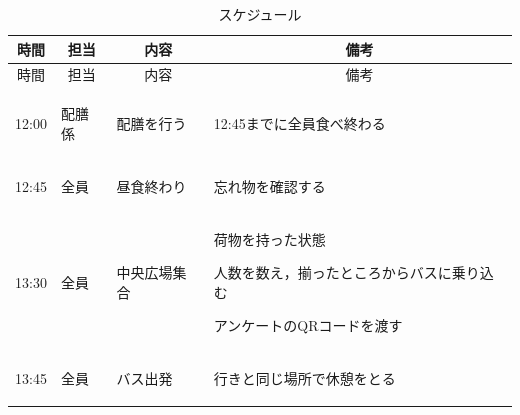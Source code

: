 \begin{longtable}[c]{|p{}|p{}|p{}|p{}|}
  \caption{スケジュール} \\
  \hline
  \multicolumn{1}{|c|}{時間} & \multicolumn{1}{c|}{担当} & \multicolumn{1}{c|}{内容} & \multicolumn{1}{c|}{備考} \\
  \hline
  \endfirsthead
  
  \hline
  \multicolumn{1}{|c|}{時間} & \multicolumn{1}{c|}{担当} & \multicolumn{1}{c|}{内容} & \multicolumn{1}{c|}{備考} \\
  \hline
  \endhead
  
  \hline
  \endfoot
  
  \hline
  \endlastfoot
  
  \begin{tpacol}
    12:00
  \end{tpacol}&
  \begin{tpbcol}
    配膳係
  \end{tpbcol}&
  \begin{tpccol}
    配膳を行う
  \end{tpccol}&
  \begin{tpdcol}
    12:45までに全員食べ終わる
  \end{tpdcol}\\

  \begin{tpacol}
    12:45
  \end{tpacol}&
  \begin{tpbcol}
    全員
  \end{tpbcol}&
  \begin{tpccol}
    昼食終わり
  \end{tpccol}&
  \begin{tpdcol}
    忘れ物を確認する
  \end{tpdcol}\\

  \begin{tpacol}
    13:30
  \end{tpacol}&
  \begin{tpbcol}
    全員
  \end{tpbcol}&
  \begin{tpccol}
    中央広場集合
  \end{tpccol}&
  \begin{tpdcol}
    荷物を持った状態 \par
    人数を数え，揃ったところからバスに乗り込む \par
    アンケートのQRコードを渡す
  \end{tpdcol}\\
    
  \begin{tpacol}
    13:45
  \end{tpacol}&
  \begin{tpbcol}
    全員
  \end{tpbcol}&
  \begin{tpccol}
    バス出発
  \end{tpccol}&
  \begin{tpdcol}
    行きと同じ場所で休憩をとる
  \end{tpdcol}\\

\end{longtable}
